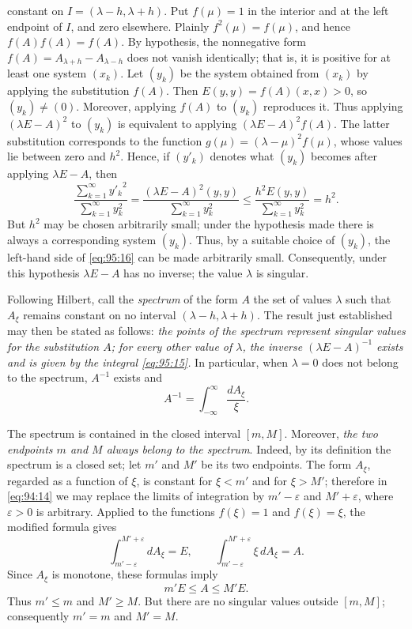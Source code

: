 \documentclass[
  paper=b5,
  fontsize=13pt,
  twoside=true,
  open=any,
  bookmarkpackage=false,
  chapterprefix=true,
  headings=normal
]{scrbook}
\theoremstyle{definition}
\begin{document}
constant on \(I=(\lambda-h,\lambda+h)\).  Put \(f(\mu)=1\) in the interior and
at the left endpoint of \(I\), and zero elsewhere.  Plainly \(f^2(\mu)=f(\mu)\),
and hence
\(f(A)f(A)=f(A)\).  By hypothesis, the nonnegative form
\(f(A)=A_{\lambda+h}-A_{\lambda-h}\) does not vanish identically; that is, it is
positive for at least one system \((x_k)\).  Let \((y_k)\) be the system obtained
from \((x_k)\) by applying the substitution \(f(A)\).  Then
\(E(y,y)=f(A)(x,x)>0\), so \((y_k)\ne(0)\).  Moreover, applying \(f(A)\) to
\((y_k)\) reproduces it.  Thus applying \((\lambda E-A)^2\) to \((y_k)\) is
equivalent to applying \((\lambda E-A)^2f(A)\).  The latter substitution
corresponds to the function \(g(\mu)=(\lambda-\mu)^2f(\mu)\), whose values lie
between zero and \(h^2\).  Hence, if \((y'_k)\) denotes what \((y_k)\) becomes
after applying \(\lambda E-A\), then
\begin{equation}
  \frac{\sum_{k=1}^{\infty}{y'_k}^{2}}
       {\sum_{k=1}^{\infty}y_k^2}
  =\frac{(\lambda E-A)^2(y,y)}{\sum_{k=1}^{\infty}y_k^2}
  \le\frac{h^2E(y,y)}{\sum_{k=1}^{\infty}y_k^2}=h^2.
  \tag{16}\label{eq:95:16}
\end{equation}
But \(h^2\) may be chosen arbitrarily small; under the hypothesis made there is
always a corresponding system \((y_k)\).  Thus, by a suitable choice of
\((y_k)\), the left-hand side of \eqref{eq:95:16} can be made arbitrarily small.
Consequently, under this hypothesis \(\lambda E-A\) has no inverse; the value
\(\lambda\) is singular.

Following Hilbert, call the \emph{spectrum} of the form \(A\) the set of values
\(\lambda\) such that \(A_\xi\) remains constant on no interval
\((\lambda-h,\lambda+h)\).  The result just established may then be stated as
follows: \emph{the points of the spectrum represent singular values for the
substitution \(A\); for every other value of \(\lambda\), the inverse
\((\lambda E-A)^{-1}\) exists and is given by the integral
\eqref{eq:95:15}.}  In particular, when \(\lambda=0\) does not belong to the
spectrum, \(A^{-1}\) exists and
\[
  A^{-1}=\int_{-\infty}^{\infty}\frac{dA_\xi}{\xi}.
\]

The spectrum is contained in the closed interval \([m,M]\).  Moreover,
\emph{the two endpoints \(m\) and \(M\) always belong to the spectrum}.  Indeed,
by its definition the spectrum is a closed set;
let \(m'\) and \(M'\) be its two endpoints.  The form \(A_\xi\), regarded as a
function of \(\xi\), is constant for \(\xi<m'\) and for \(\xi>M'\); therefore in
\eqref{eq:94:14} we may replace the limits of integration by
\(m'-\varepsilon\) and \(M'+\varepsilon\), where \(\varepsilon>0\) is arbitrary.
Applied to the functions \(f(\xi)=1\) and \(f(\xi)=\xi\), the modified formula
gives
\[
  \int_{m'-\varepsilon}^{M'+\varepsilon}dA_\xi=E,
  \qquad
  \int_{m'-\varepsilon}^{M'+\varepsilon}\xi\,dA_\xi=A.
\]
Since \(A_\xi\) is monotone, these formulas imply
\[
  m'E\le A\le M'E.
\]
Thus \(m'\le m\) and \(M'\ge M\).  But there are no singular values outside
\([m,M]\); consequently \(m'=m\) and \(M'=M\).
\end{document}
